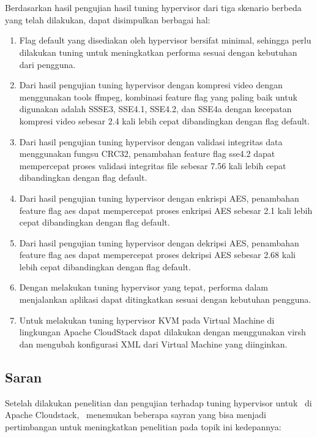 \chapter{\babLima}

Berdasarkan hasil pengujian hasil tuning hypervisor dari tiga skenario berbeda yang telah dilakukan, dapat disimpulkan berbagai hal:

\begin{enumerate}
	\item Flag default yang disediakan oleh hypervisor bersifat minimal, sehingga perlu dilakukan tuning untuk meningkatkan performa sesuai dengan kebutuhan dari pengguna.
	\item Dari hasil pengujian tuning hypervisor dengan kompresi video dengan menggunakan tools ffmpeg, kombinasi feature flag yang paling baik untuk digunakan adalah SSSE3, SSE4.1, SSE4.2, dan SSE4a dengan kecepatan kompresi video sebesar 2.4 kali lebih cepat dibandingkan dengan flag default.
	\item Dari hasil pengujian tuning hypervisor dengan validasi integritas data menggunakan fungsu CRC32, penambahan feature flag sse4.2 dapat mempercepat proses validasi integritas file sebesar 7.56 kali lebih cepat dibandingkan dengan flag default.
	\item Dari hasil pengujian tuning hypervisor dengan enkrispi AES, penambahan feature flag aes dapat mempercepat proses enkripsi AES sebesar 2.1 kali lebih cepat dibandingkan dengan flag default.
	\item Dari hasil pengujian tuning hypervisor dengan dekripsi AES, penambahan feature flag aes dapat mempercepat proses dekripsi AES sebesar 2.68 kali lebih cepat dibandingkan dengan flag default.
	\item Dengan melakukan tuning hypervisor yang tepat, performa dalam menjalankan aplikasi dapat ditingkatkan sesuai dengan kebutuhan pengguna.
	\item Untuk melakukan tuning hypervisor KVM pada Virtual Machine di lingkungan Apache CloudStack dapat dilakukan dengan menggunakan virsh dan mengubah konfigurasi XML dari Virtual Machine yang diinginkan.
\end{enumerate}

\section{Saran}
Setelah dilakukan penelitian dan pengujian terhadap tuning hypervisor untuk \vm\ di Apache Cloudstack, \saya\ menemukan beberapa sayran yang bisa menjadi pertimbangan untuk meningkatkan penelitian pada topik ini kedepannya:

